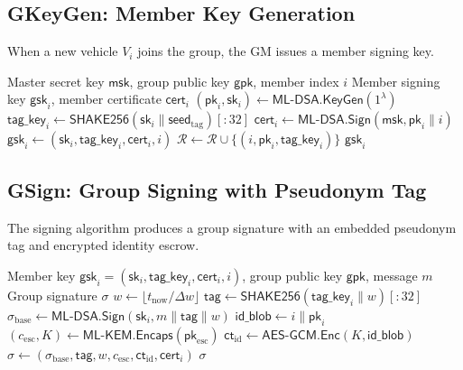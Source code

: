 \documentclass[conference,10pt]{IEEEtran}
\newcommand{\mlkem}{\textsf{ML-KEM}}
\newcommand{\mldsa}{\textsf{ML-DSA}}
\newcommand{\shake}{\textsf{SHAKE256}}
\newcommand{\secparam}{\lambda}
\begin{document}
\subsection{GKeyGen: Member Key Generation}

When a new vehicle $V_i$ joins the group, the GM issues a member signing key.

\begin{algorithm}[h]
\caption{$\mathsf{GKeyGen}(\mathsf{msk}, \mathsf{gpk}, i)$: Member Key Generation}
\label{alg:gkeygen}
\begin{algorithmic}[1]
\REQUIRE Master secret key $\mathsf{msk}$, group public key $\mathsf{gpk}$, member index $i$
\ENSURE Member signing key $\mathsf{gsk}_i$, member certificate $\mathsf{cert}_i$
\STATE $(\mathsf{pk}_i, \mathsf{sk}_i) \leftarrow \mldsa.\mathsf{KeyGen}(1^\secparam)$
\STATE $\mathsf{tag\_key}_i \leftarrow \shake(\mathsf{sk}_i \| \mathsf{seed}_{\mathrm{tag}})[:32]$
\STATE $\mathsf{cert}_i \leftarrow \mldsa.\mathsf{Sign}(\mathsf{msk}, \mathsf{pk}_i \| i)$
\STATE $\mathsf{gsk}_i \leftarrow (\mathsf{sk}_i, \mathsf{tag\_key}_i, \mathsf{cert}_i, i)$
\STATE $\mathcal{R} \leftarrow \mathcal{R} \cup \{(i, \mathsf{pk}_i, \mathsf{tag\_key}_i)\}$
\RETURN $\mathsf{gsk}_i$
\end{algorithmic}
\end{algorithm}

\subsection{GSign: Group Signing with Pseudonym Tag}

The signing algorithm produces a group signature with an embedded pseudonym tag and encrypted identity escrow.

\begin{algorithm}[h]
\caption{$\mathsf{GSign}(\mathsf{gsk}_i, \mathsf{gpk}, m)$: Group Signing}
\label{alg:gsign}
\begin{algorithmic}[1]
\REQUIRE Member key $\mathsf{gsk}_i = (\mathsf{sk}_i, \mathsf{tag\_key}_i, \mathsf{cert}_i, i)$, group public key $\mathsf{gpk}$, message $m$
\ENSURE Group signature $\sigma$
\STATE $w \leftarrow \lfloor t_{\mathrm{now}} / \Delta w \rfloor$
\STATE $\mathsf{tag} \leftarrow \shake(\mathsf{tag\_key}_i \| w)[:32]$
\STATE $\sigma_{\mathrm{base}} \leftarrow \mldsa.\mathsf{Sign}(\mathsf{sk}_i, m \| \mathsf{tag} \| w)$
\STATE $\mathsf{id\_blob} \leftarrow i \| \mathsf{pk}_i$
\STATE $(c_{\mathrm{esc}}, K) \leftarrow \mlkem.\mathsf{Encaps}(\mathsf{pk}_{\mathrm{esc}})$
\STATE $\mathsf{ct}_{\mathrm{id}} \leftarrow \mathsf{AES\text{-}GCM}.\mathsf{Enc}(K, \mathsf{id\_blob})$
\STATE $\sigma \leftarrow (\sigma_{\mathrm{base}}, \mathsf{tag}, w, c_{\mathrm{esc}}, \mathsf{ct}_{\mathrm{id}}, \mathsf{cert}_i)$
\RETURN $\sigma$
\end{algorithmic}
\end{algorithm}
\end{document}
